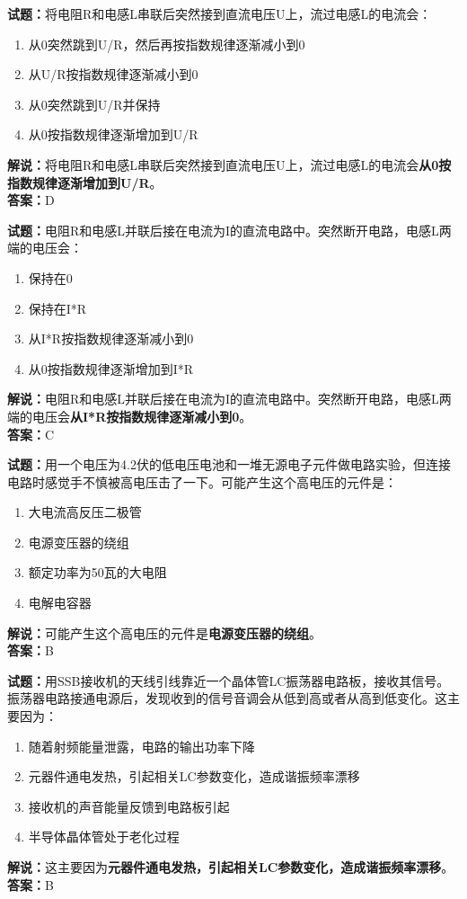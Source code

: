 \documentclass{ctexbook}
\begin{document}
\bigskip


\noindent\textbf{试题：}将电阻R和电感L串联后突然接到直流电压U上，流过电感L的电流会：
\begin{enumerate}[leftmargin=3em]
\item 从0突然跳到U/R，然后再按指数规律逐渐减小到0
\item 从U/R按指数规律逐渐减小到0
\item 从0突然跳到U/R并保持
\item 从0按指数规律逐渐增加到U/R
\end{enumerate}
\noindent\textbf{解说：}将电阻R和电感L串联后突然接到直流电压U上，流过电感L的电流会\textbf{从0按指数规律逐渐增加到U/R}。\\\noindent\textbf{答案：}D




\bigskip


\noindent\textbf{试题：}电阻R和电感L并联后接在电流为I的直流电路中。突然断开电路，电感L两端的电压会：
\begin{enumerate}[leftmargin=3em]
\item 保持在0
\item 保持在I*R
\item 从I*R按指数规律逐渐减小到0
\item 从0按指数规律逐渐增加到I*R
\end{enumerate}
\noindent\textbf{解说：}电阻R和电感L并联后接在电流为I的直流电路中。突然断开电路，电感L两端的电压会\textbf{从I*R按指数规律逐渐减小到0}。\\\noindent\textbf{答案：}C




\bigskip


\noindent\textbf{试题：}用一个电压为4.2伏的低电压电池和一堆无源电子元件做电路实验，但连接电路时感觉手不慎被高电压击了一下。可能产生这个高电压的元件是：
\begin{enumerate}[leftmargin=3em]
\item 大电流高反压二极管
\item 电源变压器的绕组
\item 额定功率为50瓦的大电阻
\item 电解电容器
\end{enumerate}
\noindent\textbf{解说：}可能产生这个高电压的元件是\textbf{电源变压器的绕组}。\\\noindent\textbf{答案：}B

\bigskip


\noindent\textbf{试题：}用SSB接收机的天线引线靠近一个晶体管LC振荡器电路板，接收其信号。振荡器电路接通电源后，发现收到的信号音调会从低到高或者从高到低变化。这主要因为：
\begin{enumerate}[leftmargin=3em]
\item 随着射频能量泄露，电路的输出功率下降
\item 元器件通电发热，引起相关LC参数变化，造成谐振频率漂移
\item 接收机的声音能量反馈到电路板引起
\item 半导体晶体管处于老化过程
\end{enumerate}
\noindent\textbf{解说：}这主要因为\textbf{元器件通电发热，引起相关LC参数变化，造成谐振频率漂移}。\\\noindent\textbf{答案：}B
\end{document}
